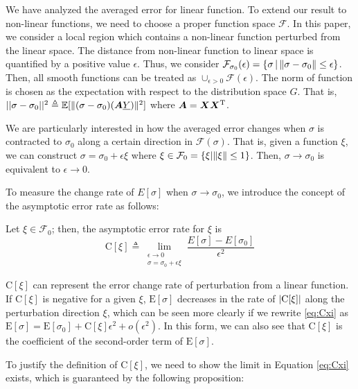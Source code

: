 \documentclass[appliedmath,article,accept,pdftex,moreauthors]{Definitions/mdpi}
\begin{document}
We have analyzed the averaged error for linear function.
To extend our result to non-linear functions, we need to choose a proper function space $\mathcal{F}$.
In this paper, we consider a local region which contains a non-linear function perturbed from the linear space.
The distance from non-linear function to linear space is quantified by a positive value $\epsilon$.
Thus, we consider $\mathcal{F}_{\sigma_0}(\epsilon) =\{ \sigma \,|\, \lVert\sigma - \sigma_0\rVert \leq \epsilon\}$.
Then, all smooth functions can be treated as $\cup_{\epsilon>0} \mathcal{F}(\epsilon)$.
The norm of function is chosen as the expectation with respect to the distribution space $G$.
That is, $||\sigma - \sigma_0||^2\triangleq \mathbb{E}[\lVert(\sigma - \sigma_0)(\bm{A}\underline{Y})\rVert^2] $
where $\bm{A} = \bm{X}\bm{X}^{\mathrm{T}}$.


We are particularly interested in how the averaged error changes
when $\sigma$ is contracted to $\sigma_0$ along a certain direction in $\mathcal{F}(\sigma)$.
That is, given a function $\xi$, we can construct $\sigma = \sigma_0 + \epsilon \xi$
where $\xi \in \mathcal{F}_0 = \{\xi | \lVert\xi\rVert \leq 1 \}$. Then, $\sigma \to \sigma_0$ is equivalent to $\epsilon \to 0$.

To measure the change rate of $E[\sigma]$ when $\sigma \to \sigma_0$,
we introduce the concept of the asymptotic error rate as follows:
\begin{Definition}
Let $\xi \in \mathcal{F}_0$; then, the asymptotic error rate for $\xi$ is
\begin{equation}\label{eq:Cxi}
\mathrm{C}[\xi] \triangleq \lim_{\substack{\epsilon \to 0 \\ \sigma = \sigma_0 + \epsilon \xi}} \frac{E[\sigma] - E[\sigma_0]}{\epsilon^2}
\end{equation}
\end{Definition}

$\mathrm{C}[\xi]$ can represent the error change rate of perturbation from a linear function.
If $\mathrm{C}[\xi]$ is negative for a given $\xi$,
$\mathrm{E}[\sigma]$ decreases in the rate of $\lvert\mathrm{C}[\xi]\rvert$ along the perturbation direction $\xi$,
which can be seen more clearly if we rewrite \eqref{eq:Cxi} as
$\mathrm{E}[\sigma] = \mathrm{E}[\sigma_0] +
\mathrm{C}[\xi]\epsilon^2 + o(\epsilon^2)$.
In this form, we can also see that $\mathrm{C}[\xi]$ is the coefficient of the second-order term of $\mathrm{E}[\sigma]$.

To justify the definition of $\mathrm{C}[\xi]$, we need to show the limit in Equation \eqref{eq:Cxi} exists, which is guaranteed by the following proposition:
\end{document}

